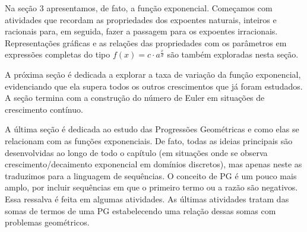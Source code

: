 \begin{apresentacao}
Na seção 3 apresentamos, de fato, a função exponencial. Começamos com atividades que recordam as propriedades dos expoentes naturais, inteiros e racionais para, em seguida, fazer a passagem para os expoentes irracionais. Representações gráficas e as relações das propriedades com os parâmetros em expressões completas do tipo $f(x)=c\cdot a^{\frac xd}$ são também exploradas nesta seção.

A próxima seção é dedicada a explorar a taxa de variação da função exponencial, evidenciando que ela supera todos os outros crescimentos que já foram estudados. A seção termina com a construção do número de Euler em situações de crescimento contínuo.

A última seção é dedicada ao estudo das Progressões Geométricas e como elas se relacionam com as funções exponenciais. De fato, todas as ideias principais são desenvolvidas ao longo de todo o capítulo (em situações onde se observa crescimento/decaimento exponencial em domínios discretos), mas apenas neste as traduzimos para a linguagem de sequências. O conceito de PG é um pouco mais amplo, por incluir sequências em que o primeiro termo ou a razão são negativos. Essa ressalva é feita em algumas atividades. As últimas atividades tratam das somas de termos de uma PG estabelecendo uma relação dessas somas com problemas geométricos.
\end{apresentacao}

